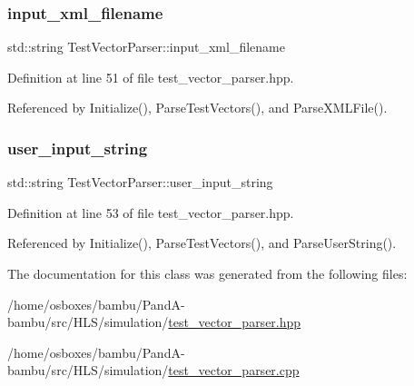 \subsubsection{\texorpdfstring{input\+\_\+xml\+\_\+filename}{input\_xml\_filename}}
{\footnotesize\ttfamily std\+::string Test\+Vector\+Parser\+::input\+\_\+xml\+\_\+filename\hspace{0.3cm}{\ttfamily [private]}}



Definition at line 51 of file test\+\_\+vector\+\_\+parser.\+hpp.



Referenced by Initialize(), Parse\+Test\+Vectors(), and Parse\+X\+M\+L\+File().

\mbox{\label{classTestVectorParser_a2c13d1f9b525391d16b4171a38857eca}} 
\subsubsection{\texorpdfstring{user\+\_\+input\+\_\+string}{user\_input\_string}}
{\footnotesize\ttfamily std\+::string Test\+Vector\+Parser\+::user\+\_\+input\+\_\+string\hspace{0.3cm}{\ttfamily [private]}}



Definition at line 53 of file test\+\_\+vector\+\_\+parser.\+hpp.



Referenced by Initialize(), Parse\+Test\+Vectors(), and Parse\+User\+String().



The documentation for this class was generated from the following files\+:\begin{DoxyCompactItemize}
\item 
/home/osboxes/bambu/\+Pand\+A-\/bambu/src/\+H\+L\+S/simulation/\hyperlink{test__vector__parser_8hpp}{test\+\_\+vector\+\_\+parser.\+hpp}\item 
/home/osboxes/bambu/\+Pand\+A-\/bambu/src/\+H\+L\+S/simulation/\hyperlink{test__vector__parser_8cpp}{test\+\_\+vector\+\_\+parser.\+cpp}\end{DoxyCompactItemize}
